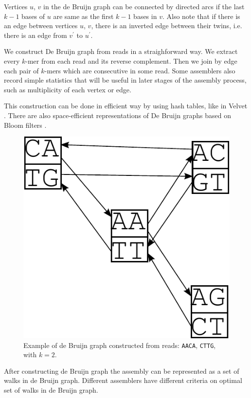 Vertices $u$, $v$ in the de Bruijn graph can be connected by directed arcs if the last
$k-1$ bases of $u$ are same as the first $k-1$ bases in $v$. Also note that
if there is an edge between vertices $u$, $v$, there is an inverted edge between their twins,
i.e. there is an edge from $v^{'}$ to $u^{'}$.

We construct De Bruijn graph from reads in a straighforward way.
We extract every $k$-mer from each read and its reverse complement.
Then we join by edge each pair of $k$-mers which are consecutive in some read.
Some assemblers also record simple statistics that will be useful in later
stages of the assembly process, such as multiplicity of each vertex or edge.

This construction can be done in efficient way by using hash tables, like in Velvet \citep{Velvet}.
There are also space-efficient representations of De Bruijn graphs based on Bloom filters \citep{minia}.

\begin{figure}
  \centerline{\includegraphics[scale=0.5]{../figures/db.pdf}}
  \caption{Example of de Bruijn graph constructed from reads: \texttt{AACA}, \texttt{CTTG}, with $k=2$.}
\end{figure}

After constructing de Bruijn graph the assembly can be represented
as a set of walks in de Bruijn graph. Different assemblers
have different criteria on optimal set of walks in de Bruijn graph. 

